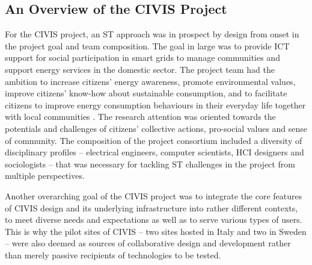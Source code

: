 \subsection{An Overview of the CIVIS Project}

For the CIVIS project, an ST approach was in prospect by design from onset
in the project goal and team composition. The goal in large was to provide ICT support for social participation in smart grids to manage communities and support energy services in the domestic sector. The project team had the ambition to increase citizens' energy awareness, promote environmental values, improve citizens' know-how about sustainable consumption, and to facilitate citizens to improve energy consumption behaviours in their everyday life together with local communities \cite{Huang2014,Huang2015a,Huang2016}. 
The research attention was oriented towards the potentials and challenges of citizens' collective actions, pro-social values and sense of community. 
The composition of the project consortium included a diversity of disciplinary profiles -- electrical engineers, computer scientists, HCI designers and sociologists -- that was necessary for tackling ST challenges in the project from multiple perspectives. %
% 




Another overarching goal of the CIVIS project was to integrate the core features of CIVIS design and its underlying infrastructure into rather different contexts, to meet diverse needs and expectations as well as to serve various types of users. 
This is why the pilot sites of CIVIS -- two sites hosted in Italy and two in Sweden -- were also deemed as sources of collaborative design and development rather than merely passive recipients of technologies to be tested.  


